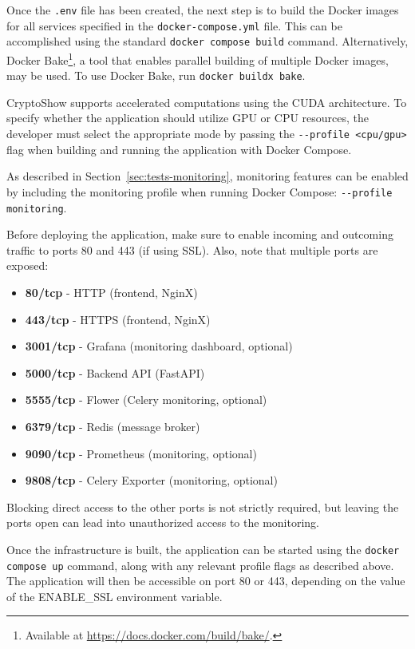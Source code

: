Once the \lstinline|.env| file has been created, the next step is to build the Docker images for all services specified in the \lstinline!docker-compose.yml! file. This can be accomplished using the standard \lstinline|docker compose build| command. Alternatively, Docker Bake\footnote{Available at \url{https://docs.docker.com/build/bake/}.}, a tool that enables parallel building of multiple Docker images, may be used. To use Docker Bake, run \lstinline|docker buildx bake|.

CryptoShow supports accelerated computations using the CUDA architecture. To specify whether the application should utilize GPU or CPU resources, the developer must select the appropriate mode by passing the \lstinline|--profile <cpu/gpu>| flag when building and running the application with Docker Compose.

As described in Section~\ref{sec:tests-monitoring}, monitoring features can be enabled by including the monitoring profile when running Docker Compose: \lstinline|--profile monitoring|.

Before deploying the application, make sure to enable incoming and outcoming traffic to ports 80 and 443 (if using SSL). Also, note that multiple ports are exposed:

\begin{itemize}
    \item \textbf{80/tcp} - HTTP (frontend, NginX)
    \item \textbf{443/tcp} - HTTPS (frontend, NginX)
    \item \textbf{3001/tcp} - Grafana (monitoring dashboard, optional)
    \item \textbf{5000/tcp} - Backend API (FastAPI)
    \item \textbf{5555/tcp} - Flower (Celery monitoring, optional)
    \item \textbf{6379/tcp} - Redis (message broker)
    \item \textbf{9090/tcp} - Prometheus (monitoring, optional)
    \item \textbf{9808/tcp} - Celery Exporter (monitoring, optional)
\end{itemize}

Blocking direct access to the other ports is not strictly required, but leaving the ports open can lead into unauthorized access to the monitoring.

Once the infrastructure is built, the application can be started using the \lstinline|docker compose up| command, along with any relevant profile flags as described above. The application will then be accessible on port 80 or 443, depending on the value of the ENABLE\_SSL environment variable.

